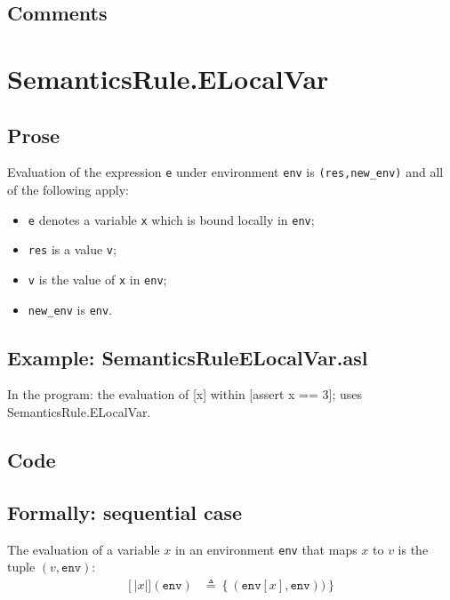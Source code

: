 \documentclass{book}
\newcommand\llbracket{[|}
\newcommand\rrbracket{|]}
\newcommand\interp[1]{\left\llbracket #1 \right\rrbracket}
\begin{document}
  \subsection{Comments}

\section{SemanticsRule.ELocalVar \label{sec:SemanticsRule.ELocalVar}}

  \subsection{Prose}
  Evaluation of the expression \texttt{e} under environment \texttt{env} is
  \texttt{(res,new\_env)} and all of the following apply:
  \begin{itemize}
  \item \texttt{e} denotes a variable \texttt{x} which is bound locally in \texttt{env};
  \item \texttt{res} is a value \texttt{v};
  \item \texttt{v} is the value of \texttt{x} in \texttt{env};
  \item \texttt{new\_env} is \texttt{env}.
  \end{itemize}

  \subsection{Example: SemanticsRuleELocalVar.asl}
    In the program:
    the evaluation of [x] within [assert x == 3]; uses SemanticsRule.ELocalVar.

  \subsection{Code}

  \subsection{Formally: sequential case}
  The evaluation of a variable $x$ in an environment \texttt{env} that maps $x$ to $v$
  is the tuple $(v,\texttt{env})$: 
  \begin{align}
  \interp{x}(\texttt{env}) & \triangleq \left\{ (\texttt{env}[x], \texttt{env})) \right\}
  \label{eq:sem-seq-var}
  \end{align} 
 
\end{document}

